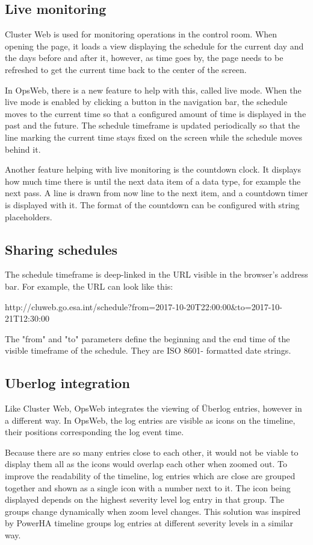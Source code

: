 \subsection{Live monitoring}
Cluster Web is used for monitoring operations in the control room. When opening the page, it loads a view displaying the schedule for the current day and the days before and after it, however, as time goes by, the page needs to be refreshed to get the current time back to the center of the screen.

In OpsWeb, there is a new feature to help with this, called live mode. When the live mode is enabled by clicking a button in the navigation bar, the schedule moves to the current time so that a configured amount of time is displayed in the past and the future. The schedule timeframe is updated periodically so that the line marking the current time stays fixed on the screen while the schedule moves behind it.

Another feature helping with live monitoring is the countdown clock. It displays how much time there is until the next data item of a data type, for example the next pass. A line is drawn from now line to the next item, and a countdown timer is displayed with it. The format of the countdown can be configured with string placeholders.

\subsection{Sharing schedules}
The schedule timeframe is deep-linked in the URL visible in the browser's address bar. For example, the URL can look like this:

http://cluweb.go.esa.int/schedule?from=2017-10-20T22:00:00\&to=2017-10-21T12:30:00

The "from" and "to" parameters define the beginning and the end time of the visible timeframe of the schedule. They are ISO 8601- formatted date strings.


\subsection{Uberlog integration}
Like Cluster Web, OpsWeb integrates the viewing of Überlog entries, however in a different way. In OpsWeb, the log entries are visible as icons on the timeline, their positions corresponding the log event time. 

Because there are so many entries close to each other, it would not be viable to display them all as the icons would overlap each other when zoomed out. To improve the readability of the timeline, log entries which are close are grouped together and shown as a single icon with a number next to it. The icon being displayed depends on the highest severity level log entry in that group. The groups change dynamically when zoom level changes. This solution was inspired by PowerHA timeline groups log entries at different severity levels in a similar way. \cite{ibm_timeline}

